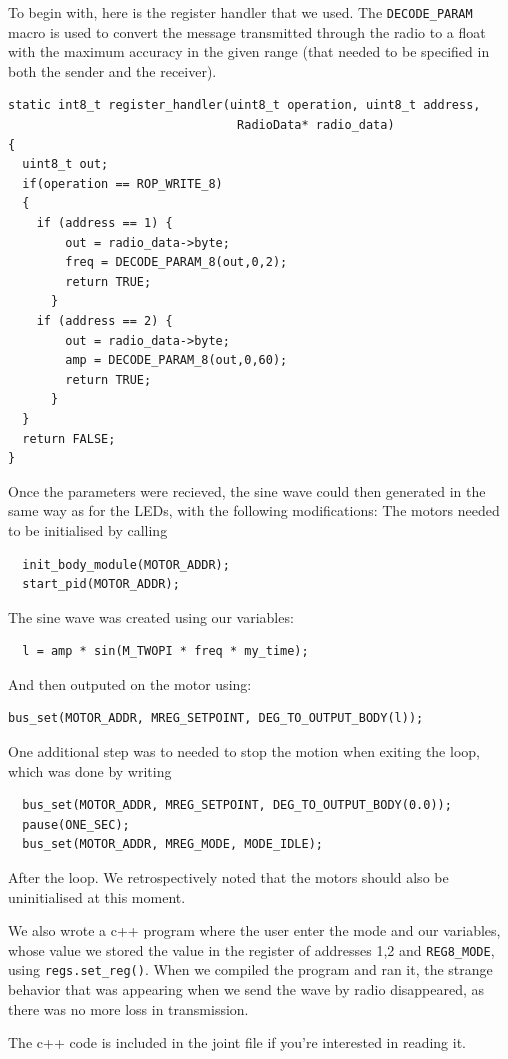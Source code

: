 \documentclass[11pt]{article}
\begin{document}
To begin with, here is the register handler that we used. The \texttt{DECODE\_PARAM} macro is used to convert the message transmitted through the radio to a float with the maximum accuracy in the given range (that needed to be specified in both the sender and the receiver).
\begin{verbatim}
static int8_t register_handler(uint8_t operation, uint8_t address,
                                RadioData* radio_data)
{
  uint8_t out;
  if(operation == ROP_WRITE_8)
  {
    if (address == 1) {
        out = radio_data->byte;
        freq = DECODE_PARAM_8(out,0,2);
        return TRUE;
      }
    if (address == 2) {
        out = radio_data->byte;
        amp = DECODE_PARAM_8(out,0,60);
        return TRUE;
      }
  }
  return FALSE;
}
\end{verbatim}
Once the parameters were recieved, the sine wave could then generated in the same way as for the LEDs, with the following modifications: The motors needed to be initialised by calling 
\begin{verbatim}
  init_body_module(MOTOR_ADDR);
  start_pid(MOTOR_ADDR);
\end{verbatim}
The sine wave was created using our variables:
\begin{verbatim}
  l = amp * sin(M_TWOPI * freq * my_time);
\end{verbatim}
And then outputed on the motor using:
\begin{verbatim}
bus_set(MOTOR_ADDR, MREG_SETPOINT, DEG_TO_OUTPUT_BODY(l));
\end{verbatim}
One additional step was to needed to stop the motion when exiting the loop, which was done by writing 
\begin{verbatim}
  bus_set(MOTOR_ADDR, MREG_SETPOINT, DEG_TO_OUTPUT_BODY(0.0));
  pause(ONE_SEC);
  bus_set(MOTOR_ADDR, MREG_MODE, MODE_IDLE);
\end{verbatim}
After the loop. We retrospectively noted that the motors should also be uninitialised at this moment. %

We also wrote a c++ program where the user enter the mode and our variables, whose value we stored the value in the register of addresses 1,2 and \texttt{REG8\_MODE}, using \texttt{regs.set\_reg()}. When we compiled the program and ran it, the strange behavior that was appearing when we send the wave by radio disappeared, as there was no more loss in transmission.

The c++ code is included in the joint file if you're interested in reading it. 
\end{document}
